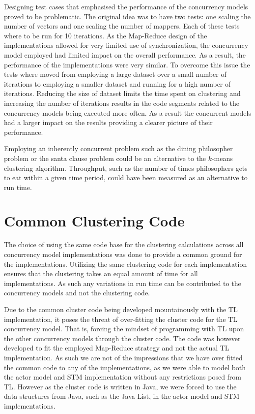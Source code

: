 Designing test cases that emphasised the performance of the concurrency models proved to be problematic. The original idea was to have two tests: one scaling the number of vectors and one scaling the number of mappers. Each of these tests where to be run for 10 iterations. As the Map-Reduce design of the implementations allowed for very limited use of synchronization, the concurrency model employed had limited impact on the overall performance. As a result, the performance of the implementations were very similar. To overcome this issue the tests where moved from employing a large dataset over a small number of iterations to employing a smaller dataset and running for a high number of iterations. Reducing the size of dataset limits the time spent on clustering and increasing the number of iterations results in the code segments related to the concurrency models being executed more often. As a result the concurrent models had a larger impact on the results providing a clearer picture of their performance.

Employing an inherently concurrent problem such as the dining philosopher problem\cite[p. 673]{hoare1978communicating} or the santa clause problem\cite{trono1994new} could be an alternative to the $k$-means clustering algorithm. Throughput, such as the number of times philosophers gets to eat within a given time period, could have been measured as an alternative to run time.

\section{Common Clustering Code}
The choice of using the same code base for the clustering calculations across all concurrency model implementations was done to provide a common ground for the implementations. Utilizing the same clustering code for each implementation ensures that the clustering takes an equal amount of time for all implementations. As such any variations in run time can be contributed to the concurrency models and not the clustering code. 


Due to the common cluster code being developed mountainously with the \ac{TL} implementation, it poses the threat of over-fitting the cluster code for the \ac{TL} concurrency model. That is, forcing the mindset of programming with \ac{TL} upon the other concurrency models through the cluster code. The code was however developed to fit the employed Map-Reduce strategy and not the actual \ac{TL} implementation. As such we are not of the impressions that we have over fitted the common code to any of the implementations, as we were able to model both the actor model and \ac{STM} implementation without any restrictions posed from \ac{TL}. However as the cluster code is written in Java, we were forced to use the data structures from Java, such as the Java List, in the actor model and \ac{STM} implementations.

